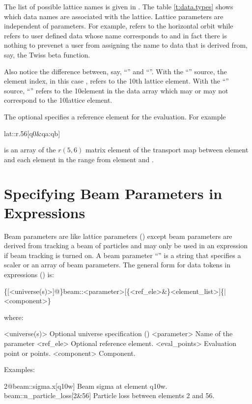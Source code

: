 The list of possible lattice  names is given in . The
table \ref{t:data.types} shows which data names are associated with the lattice. Lattice
parameters are independent of  parameters. For example,  refers
to the horizontal orbit while  refers to user defined data whose name
corresponds to  and in fact there is nothing to prevenet a user from assigning
the name  to data that is derived from, say, the Twiss beta function.

Also notice the difference between, say, ``'' and
``''. With the ``'' source, the element index, in this
case , refers to the 10th lattice element. With the ``'' source,
``'' refers to the 10\Th element in the  data array which may or may
not correspond to the 10\Th lattice element.

The optional  specifies a reference
element for the evaluation. For example
\begin{example}
  lat::r.56[q0\&qa:qb]
\end{example}  
is an array of the $r(5,6)$ matrix element of the transport map
between element  and each element in the range from element
 and . 

\section{Specifying Beam Parameters in Expressions}
\label{s:beam.token}

Beam parameters are like lattice parameters () except beam parameters
are derived from tracking a beam of particles and may only be used in an expression if beam
tracking is turned on.  A beam parameter ``'' is a string that specifies a scaler or an
array of beam parameters. The general form for data tokens in expressions
() is:
\begin{example}
  \{[<universe(s)>]@\}beam::<parameter>[\{<ref_ele>&\}<element_list>]\{|<component>\}
\end{example}
where:
\begin{example}
  <universe(s)>       Optional universe specification ()
  <parameter>         Name of the parameter
  <ref_ele>           Optional reference element.
  <eval_points>       Evaluation point or points.
  <component>         Component. 
\end{example}
Examples:
\begin{example}
  2@beam::sigma.x[q10w]           Beam sigma at element q10w.
  beam::n_particle_loss[2&56]     Particle loss between elements 2 and 56.
\end{example}

